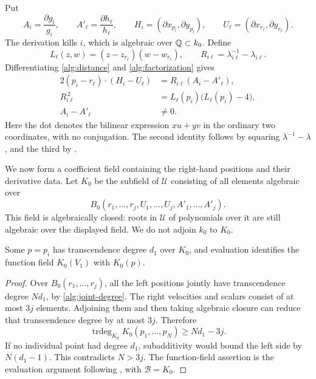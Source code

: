 Put
\[
 A_i=\frac{\partial g_i}{g_i},\qquad
 A'_\ell=\frac{\partial h_\ell}{h_\ell},\qquad
 H_i=(\partial x_{p_i},\partial y_{p_i}),\qquad
 U_\ell=(\partial x_{r_\ell},\partial y_{r_\ell}).
\]
The derivation kills \(i\), which is algebraic over \(\mathbb Q\subset k_0\).
Define
\[
 L_\ell(z,w)=(z-z_{r_\ell})(w-w_{r_\ell}),
 \qquad R_{i\ell}=\lambda_{i\ell}^{-1}-\lambda_{i\ell}.
\]
Differentiating \eqref{alg:distance} and \eqref{alg:factorization} gives
\begin{align}
 2(p_i-r_\ell)\cdot(H_i-U_\ell)
       &=R_{i\ell}(A_i-A'_\ell),
          \label{alg:differential}\\
 R_{i\ell}^{\,2}
       &=L_\ell(p_i)\bigl(L_\ell(p_i)-4\bigr),
          \label{alg:radicand}\\
 A_i-A'_\ell&\ne0.
          \label{alg:nonzero-derivative}
\end{align}
Here the dot denotes the bilinear expression \(xu+yv\) in the ordinary
two coordinates, with no conjugation. The second identity follows by
squaring \(\lambda^{-1}-\lambda\), and the third by
.

We now form a coefficient field containing the right-hand positions and
their derivative data. Let \(K_0\) be the subfield of \(\mathcal U\)
consisting of all elements algebraic over
\[
 B_0(r_1,\ldots,r_j,U_1,\ldots,U_j,A'_1,\ldots,A'_j).
\]
This field is algebraically closed: roots in \(\mathcal U\) of
polynomials over it are still algebraic over the displayed field.
We do not adjoin \(k_0\) to \(K_0\).

\begin{lemma}\label{alg:surviving-point}
Some \(p=p_i\) has transcendence degree \(d_1\) over \(K_0\), and
evaluation identifies the function field \(K_0(V_1)\) with \(K_0(p)\).
\end{lemma}

\begin{proof}
Over \(B_0(r_1,\ldots,r_j)\), all the left positions jointly have
transcendence degree \(Nd_1\), by \eqref{alg:joint-degree}. The right
velocities and scalars consist of at most \(3j\) elements. Adjoining
them and then taking algebraic closure can reduce that transcendence
degree by at most \(3j\). Therefore
\begin{equation}\label{alg:dimension-accounting}
 \operatorname{trdeg}_{K_0}K_0(p_1,\ldots,p_N)
       \ge Nd_1-3j.
\end{equation}
If no individual point had degree \(d_1\), subadditivity would bound
the left side by \(N(d_1-1)\). This contradicts \(N>3j\).
The function-field assertion is the evaluation argument following
, with \(\mathcal B=K_0\).
\end{proof}

